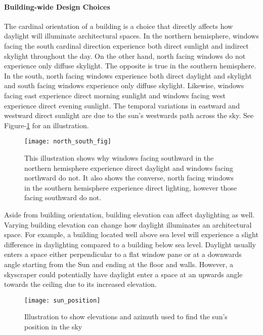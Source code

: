     \paragraph{Building-wide Design Choices} 
    The cardinal orientation of a building is a choice that directly affects how daylight will illuminate architectural spaces. In the northern hemisphere, windows facing the south cardinal direction experience both direct sunlight and indirect skylight throughout the day. On the other hand, north facing windows do not experience only diffuse skylight. The opposite is true in the southern hemisphere. In the south, north facing windows experience both direct daylight and skylight and south facing windows experience only diffuse skylight. Likewise, windows facing east experience direct morning sunlight and windows facing west experience direct evening sunlight. The temporal variations in eastward and westward direct sunlight are due to the sun's westwards path across the sky\cite{Robbins}. See Figure-\ref{fig:north_south} for an illustration.

    \begin{figure}[h]
      \centering
      \caption[Illustration of why southern facing windows experience direct daylight in the northern hemisphere.]{This illustration shows why windows facing southward in the northern hemisphere experience direct daylight and windows facing northward do not. It also shows the converse, north facing windows in the southern hemisphere experience direct lighting, however those facing southward do not.} 
      \label{fig:north_south}
      \texttt{[image: north\_south\_fig]}
    \end{figure}

    Aside from building orientation, building elevation can affect daylighting as well. Varying building elevation can change how daylight illuminates an architectural space. For example, a building located well above sea level will experience a slight difference in daylighting compared to a building below sea level. Daylight usually enters a space either perpendicular to a flat window pane or at a downwards angle starting from the Sun and ending at the floor and walls. However, a skyscraper could potentially have daylight enter a space at an upwards angle towards the ceiling due to its increased elevation.\\

    \begin{figure}[h]
      \centering
      \caption{Illustration to show elevations and azimuth used to find the sun's position in the sky} 
      \label{fig:sun_position}
      \texttt{[image: sun\_position]}
    \end{figure}


